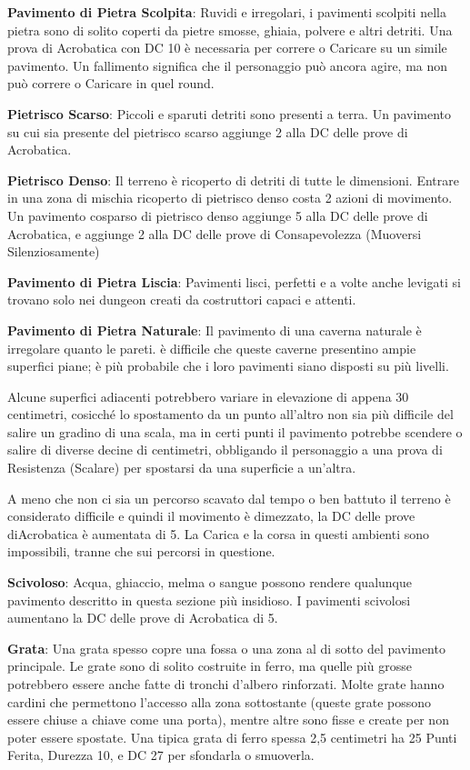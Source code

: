 \documentclass[a4paper,11pt,twoside,openany]{book}
\begin{document}
{\textbf{Pavimento di Pietra Scolpita}: Ruvidi e irregolari, i pavimenti scolpiti nella pietra sono di solito coperti da pietre smosse, ghiaia, polvere e altri detriti. Una prova di Acrobatica con DC 10 è necessaria per correre o Caricare su un simile pavimento. Un fallimento significa che il personaggio può ancora agire, ma non può correre o Caricare in quel round.

\textbf{Pietrisco Scarso}: Piccoli e sparuti detriti sono presenti a terra. Un pavimento su cui sia presente del pietrisco scarso aggiunge 2 alla DC delle prove di Acrobatica.

\textbf{Pietrisco Denso}: Il terreno è ricoperto di detriti di tutte le dimensioni. Entrare in una zona di mischia ricoperto di pietrisco denso costa 2 azioni di movimento. Un pavimento cosparso di pietrisco denso aggiunge 5 alla DC delle prove di Acrobatica, e aggiunge 2 alla DC delle prove di Consapevolezza (Muoversi Silenziosamente)

\textbf{Pavimento di Pietra Liscia}: Pavimenti lisci, perfetti e a volte anche levigati si trovano solo nei dungeon creati da costruttori capaci e attenti.

\textbf{Pavimento di Pietra Naturale}: Il pavimento di una caverna naturale è irregolare quanto le pareti. è difficile che queste caverne presentino ampie superfici piane; è più probabile che i loro pavimenti siano disposti su più livelli. 

Alcune superfici adiacenti potrebbero variare in elevazione di appena 30 centimetri, cosicché lo spostamento da un punto all'altro non sia più difficile del salire un gradino di una scala, ma in certi punti il pavimento potrebbe scendere o salire di diverse decine di centimetri, obbligando il personaggio a una prova di Resistenza (Scalare) per spostarsi da una superficie a un'altra.

A meno che non ci sia un percorso scavato dal tempo o ben battuto il terreno è considerato difficile e quindi il movimento è dimezzato, la DC delle prove diAcrobatica è aumentata di 5. La Carica e la corsa in questi ambienti sono impossibili, tranne che sui percorsi in questione.

\textbf{Scivoloso}: Acqua, ghiaccio, melma o sangue possono rendere qualunque pavimento descritto in questa sezione più insidioso. I pavimenti scivolosi aumentano la DC delle prove di Acrobatica di 5.

\textbf{Grata}: Una grata spesso copre una fossa o una zona al di sotto del pavimento principale. Le grate sono di solito costruite in ferro, ma quelle più grosse potrebbero essere anche fatte di tronchi d’albero rinforzati. Molte grate hanno cardini che permettono l’accesso alla zona sottostante (queste grate possono essere chiuse a chiave come una porta), mentre altre sono fisse e create per non poter essere spostate. Una tipica grata di ferro spessa 2,5 centimetri ha 25 Punti Ferita, Durezza 10, e DC 27 per sfondarla o smuoverla.

}
\end{document}
